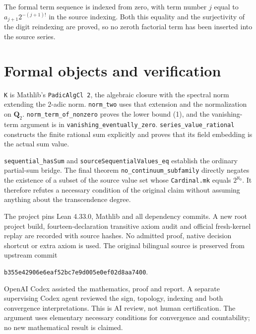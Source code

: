 \documentclass[11pt]{article}
\begin{document}
The formal term sequence is indexed from zero, with term number $j$
equal to $a_{j+1}2^{-(j+1)!}$ in the source indexing. Both this equality
and the surjectivity of the digit reindexing are proved, so no zeroth
factorial term has been inserted into the source series.

\section{Formal objects and verification}
\texttt{K} is Mathlib's \texttt{PadicAlgCl 2}, the algebraic closure with
the spectral norm extending the $2$-adic norm. \texttt{norm\_\allowbreak two}
uses that extension and the normalization on $\mathbf Q_2$.
\texttt{norm\_\allowbreak term\_\allowbreak of\_\allowbreak nonzero}
proves the lower bound (1), and the vanishing-term argument is in
\texttt{vanishing\_\allowbreak eventually\_\allowbreak zero}.
\texttt{series\_\allowbreak value\_\allowbreak rational} constructs the
finite rational sum explicitly and proves that its field embedding is
the actual sum value.

\texttt{sequential\_\allowbreak hasSum} and
\texttt{sourceSequentialValues\_\allowbreak eq} establish the ordinary
partial-sum bridge. The final theorem
\texttt{no\_\allowbreak continuum\_\allowbreak subfamily} directly
negates the existence of a subset of the source value set whose
\texttt{Cardinal.mk} equals $2^{\aleph_0}$. It therefore refutes a
necessary condition of the original claim without assuming anything
about the transcendence degree.

The project pins Lean 4.33.0, Mathlib and all dependency commits. A new
root project build, fourteen-declaration transitive axiom audit and
official fresh-kernel replay are recorded with source hashes. No
admitted proof, native decision shortcut or extra axiom is used.
The original bilingual source is preserved from upstream commit\par\noindent
\texttt{b355e42906e6eaf52bc7e9d005e0ef02d8aa7400}.\par
OpenAI Codex assisted the mathematics, proof and report. A separate
supervising Codex agent reviewed the sign, topology, indexing and both
convergence interpretations. This is AI review, not human certification.
The argument uses elementary necessary conditions for convergence and
countability; no new mathematical result is claimed.
\end{document}
